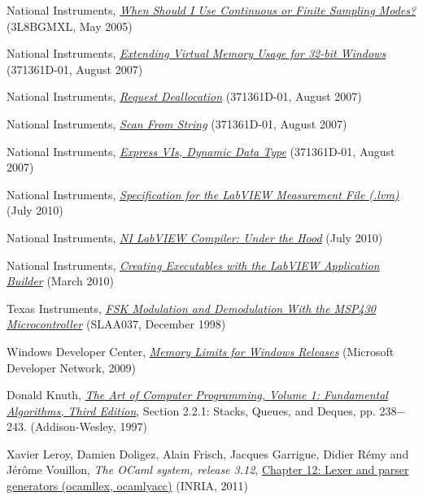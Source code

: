 \documentclass[twocolumn,pre,floats,aps,amsmath,amssymb]{revtex4}
\begin{document}
\begin{thebibliography}{99}
National Instruments, {\it \href{http://digital.ni.com/public.nsf/allkb/B86AA2D2FDE9A16086256FFC00604202}{When Should I Use Continuous or Finite Sampling Modes?}} (3L8BGMXL, May 2005)

National Instruments, {\it \href{http://zone.ni.com/reference/en-XX/help/371361D-01/lvhowto/enable_lrg_ad_aware/}{Extending Virtual Memory Usage for 32-bit Windows}} (371361D-01, August 2007)

National Instruments, {\it \href{http://zone.ni.com/reference/en-XX/help/371361D-01/glang/request_dealloc/}{Request Deallocation}} (371361D-01, August 2007)

National Instruments, {\it \href{http://zone.ni.com/reference/en-XX/help/371361D-01/glang/scan_from_string/}{Scan From String}} (371361D-01, August 2007)

National Instruments, {\it \href{http://zone.ni.com/reference/en-XX/help/371361D-01/lvconcepts/expressvis/}{Express VIs, Dynamic Data Type}} (371361D-01, August 2007)

National Instruments, {\it \href{http://zone.ni.com/devzone/cda/tut/p/id/4139}{Specification for the LabVIEW Measurement File (.lvm)}} (July 2010)

National Instruments, {\it \href{http://zone.ni.com/devzone/cda/tut/p/id/11472}{NI LabVIEW Compiler: Under the Hood}} (July 2010)

National Instruments, {\it \href{http://zone.ni.com/devzone/cda/tut/p/id/4039}{Creating Executables with the LabVIEW Application Builder}} (March 2010)

Texas Instruments, {\it \href{http://www.ti.com/lit/an/slaa037/slaa037.pdf}{FSK Modulation and Demodulation With the MSP430 Microcontroller}} (SLAA037, December 1998)

Windows Developer Center, {\it \href{http://msdn.microsoft.com/en-us/library/aa366778(VS.85).aspx}{Memory Limits for Windows Releases}} (Microsoft Developer Network, 2009)

Donald Knuth, {\it \href{http://books.google.fr/books?id=MooMkK6ERuYC}{The Art of Computer Programming, Volume 1: Fundamental Algorithms, Third Edition}}, Section 2.2.1: Stacks, Queues, and Deques, pp. 238$-$243. (Addison-Wesley, 1997)

Xavier Leroy, Damien Doligez, Alain Frisch, Jacques Garrigue, Didier R\'emy and J\'er\^ome Vouillon, {\it  The OCaml system, release 3.12}, \href{http://caml.inria.fr/pub/docs/manual-ocaml/manual026.html}{Chapter 12: Lexer and parser generators (ocamllex, ocamlyacc)} (INRIA, 2011)


\end{thebibliography}
\end{document}
